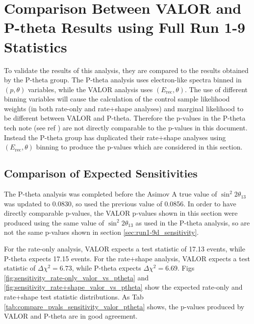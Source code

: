 \FloatBarrier

{\color{red} 

\section{Comparison Between VALOR and P-theta Results using Full Run 1-9 Statistics} \label{app:compare_valor_ptheta}

To validate the results of this analysis, they are compared to the results obtained by the P-theta group. The P-theta analysis \cite{PthetaR19cNuebarAppearance} uses electron-like spectra binned in $(p, \theta)$ variables, while the VALOR analysis uses $(E_{\text{rec}}, \theta)$. The use of different binning variables will cause the calculation of the control sample likelihood weights (in both rate-only and rate+shape analyses) and marginal likelihood to be different between VALOR and P-theta. Therefore the p-values in the P-theta tech note (see ref \cite{PthetaR19cNuebarAppearance}) are not directly comparable to the p-values in this document. Instead the P-theta group has duplicated their rate+shape analyses using $(E_{\text{rec}}, \theta)$ binning to produce the p-values which are considered in this section.


\subsection{Comparison of Expected Sensitivities}\label{app:compare_sensitivity_valor_ptheta}

The P-theta analysis was completed before the Asimov A true value of $\sin^{2} 2 \theta_{13}$ was updated to 0.0830, so used the previous value of 0.0856. In order to have directly comparable p-values, the VALOR p-values shown in this section were produced using the same value of $\sin^{2} 2 \theta_{13}$ as used in the P-theta analysis, so are not the same p-values shown in section \ref{sec:run1-9d_sensitivity}.

For the rate-only analysis, VALOR expects a test statistic of 17.13 events, while P-theta expects 17.15 events. For the rate+shape analysis, VALOR expects a test statistic of $\Delta \chi^2 = 6.73$, while P-theta expects $\Delta \chi^2 = 6.69$. Figs \ref{fig:sensitivity_rate-only_valor_vs_ptheta} and \ref{fig:sensitivity_rate+shape_valor_vs_ptheta} show the expected rate-only and rate+shape test statistic distributions. As Tab \ref{tab:compare_pvals_sensitivity_valor_ptheta} shows, the p-values produced by VALOR and P-theta are in good agreement.

}
